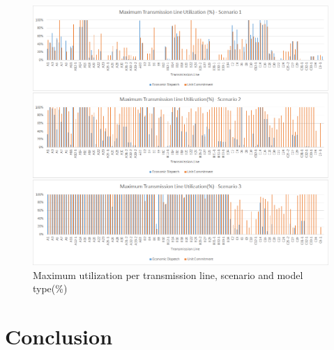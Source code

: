 \documentclass[12pt,LUDisStyle,twosided]{book}
\begin{document}
\begin{figure}[h] 
  \centering
  
	  \includegraphics[width=\textwidth,height=\textheight,keepaspectratio]{MaximumTransmissionLineUtilization.png}
  
  \caption{Maximum utilization per transmission line, scenario and model type(\%)}
  \label{fig:maximumutilizaton}
\end{figure}




\chapter{Conclusion}

\appendix



\nocite{*}


\end{document}
